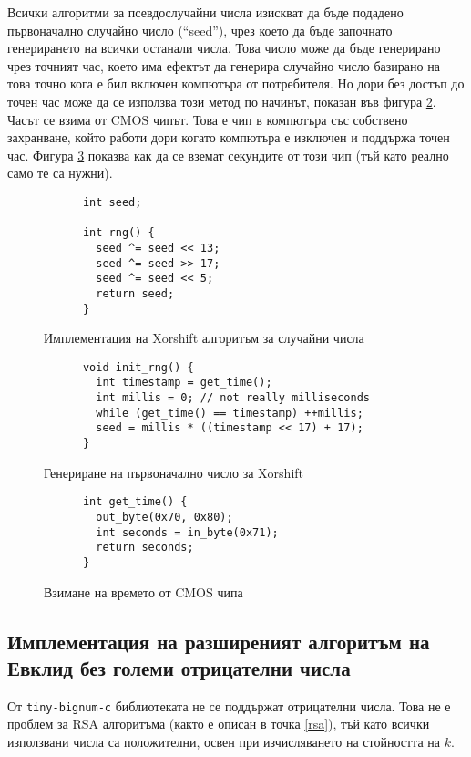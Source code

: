   Всички алгоритми за псевдослучайни числа изискват да бъде подадено първоначално случайно число (``seed''), чрез което да бъде започнато генерирането на всички останали числа. Това число може да бъде генерирано чрез точният час, което има ефектът да генерира случайно число базирано на това точно кога е бил включен компютъра от потребителя. Но дори без достъп до точен час може да се използва този метод по начинът, показан във фигура \ref{fig:seed-generation}. Часът се взима от CMOS чипът. Това е чип в компютъра със собствено захранване, който работи дори когато компютъра е изключен и поддържа точен час. Фигура \ref{fig:cmos-time} показва как да се вземат секундите от този чип (тъй като реално само те са нужни).

  \begin{figure}[htpb]
    \centering
    \caption{Имплементация на Xorshift алгоритъм за случайни числа}
    \begin{verbatim}
      int seed;

      int rng() {
        seed ^= seed << 13;
        seed ^= seed >> 17;
        seed ^= seed << 5;
        return seed;
      }
    \end{verbatim}
    \label{fig:xorshift}
  \end{figure}

  \begin{figure}[htpb]
    \centering
    \caption{Генериране на първоначално число за Xorshift}
    \begin{verbatim}
      void init_rng() {
        int timestamp = get_time();
        int millis = 0; // not really milliseconds
        while (get_time() == timestamp) ++millis;
        seed = millis * ((timestamp << 17) + 17);
      }
    \end{verbatim}
    \label{fig:seed-generation}
  \end{figure}

  \begin{figure}[htpb]
    \centering
    \begin{verbatim}
      int get_time() {
        out_byte(0x70, 0x80);
        int seconds = in_byte(0x71);
        return seconds;
      }
    \end{verbatim}
    \caption{Взимане на времето от CMOS чипа}
    \label{fig:cmos-time}
  \end{figure}

  \subsection{Имплементация на разширеният алгоритъм на Евклид без големи отрицателни числа}
  От {\tt tiny-bignum-c} библиотеката не се поддържат отрицателни числа. Това не е проблем за RSA алгоритъма (както е описан в точка \ref{rsa}), тъй като всички използвани числа са положителни, освен при изчисляването на стойността на $k$.

